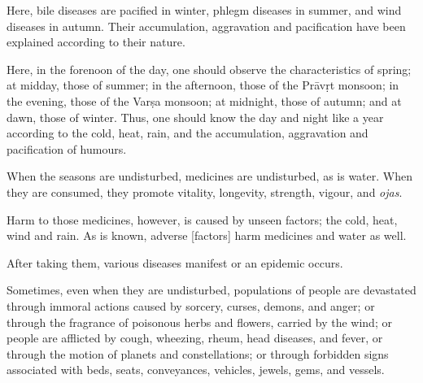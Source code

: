 \begin{translation}
	\item [13]
	Here, bile diseases are pacified in winter, phlegm diseases in summer, and wind diseases in autumn.
	Their accumulation, aggravation and pacification have been explained according to their nature. %

	\item [14]
	Here, %
	in the forenoon of the day, %
	one should observe %
	the characteristics of spring; %
	at midday, those of summer; in the afternoon, those of the Prāvṛt monsoon; %
	in the evening, those of the Varṣa monsoon;
	at midnight, those of autumn; and at dawn, those of winter. %
	Thus, one should know %
	the day and night like a year %
	according to the cold, heat, rain, and the accumulation, aggravation and pacification of humours. %

	\item [15]
	When the seasons are undisturbed, %
	medicines are undisturbed, as is water. When they are consumed, they promote vitality, %
	longevity, %
	strength, %
	vigour, %
	and \emph{ojas}. %

	\item [16]
	Harm to those medicines, however, is caused by unseen factors; %
	the cold, heat, wind and rain.
	As is known, %
	adverse [factors] %
	harm medicines and water as well.

	\item [17]
	After taking them, %
	various diseases manifest or an epidemic occurs. %

	\item [18]
	Sometimes, %
	even when they are undisturbed, %
	populations of people %
	are devastated %
	through immoral actions caused by sorcery, %
	curses, %
	demons, %
	and anger; %
	or through the fragrance of poisonous herbs and flowers, %
	carried by the wind; %
	or people are afflicted by cough, %
	wheezing, %
	rheum, %
	head diseases, %
	and fever,
	or through the motion %
	of planets and constellations; %
	or through forbidden signs %
	associated with beds, seats, conveyances, %
	vehicles, %
	jewels,
	gems, %
	and vessels. %


\end{translation}
